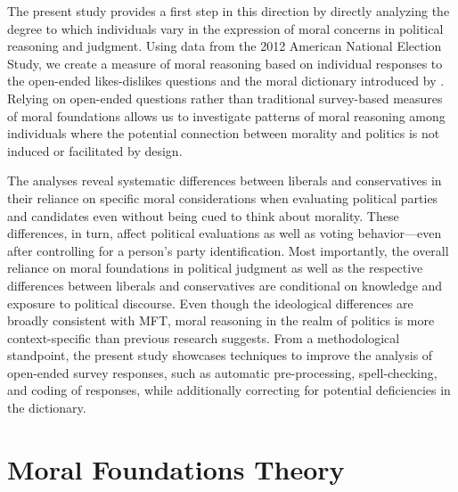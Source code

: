 \documentclass[12pt]{article}
\begin{document}
The present study provides a first step in this direction by directly analyzing the degree to which individuals vary in the expression of moral concerns in political reasoning and judgment. Using data from the 2012 American National Election Study, we create a measure of moral reasoning based on individual responses to the open-ended likes-dislikes questions and the moral dictionary introduced by \citet{graham2009liberals}. Relying on open-ended questions rather than traditional survey-based measures of moral foundations allows us to investigate patterns of moral reasoning among individuals where the potential connection between morality and politics is not induced or facilitated by design.

The analyses reveal systematic differences between liberals and conservatives in their reliance on specific moral considerations when evaluating political parties and candidates even without being cued to think about morality.
These differences, in turn, affect political evaluations as well as voting behavior---even after controlling for a person's party identification. Most importantly, the overall reliance on moral foundations in political judgment as well as the respective differences between liberals and conservatives are conditional on knowledge and exposure to political discourse. Even though the ideological differences are broadly consistent with MFT, moral reasoning in the realm of politics is more context-specific than previous research suggests. From a methodological standpoint, the present study showcases techniques to improve the analysis of open-ended survey responses, such as automatic pre-processing, spell-checking, and coding of responses, while additionally correcting for potential deficiencies in the dictionary.

\section*{Moral Foundations Theory}
\end{document}
